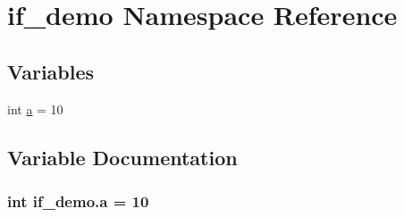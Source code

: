 \hypertarget{namespaceif__demo}{\section{if\-\_\-demo Namespace Reference}
\label{namespaceif__demo}
}
\subsection*{Variables}
\begin{DoxyCompactItemize}
\item 
int \hyperlink{namespaceif__demo_aa9f89401f1de61d42f61995597b561a4}{a} = 10
\end{DoxyCompactItemize}


\subsection{Variable Documentation}
\hypertarget{namespaceif__demo_aa9f89401f1de61d42f61995597b561a4}{
\subsubsection[{a}]{\setlength{\rightskip}{0pt plus 5cm}int if\-\_\-demo.\-a = 10}}\label{namespaceif__demo_aa9f89401f1de61d42f61995597b561a4}
